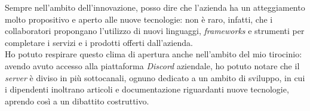 Sempre nell'ambito dell'innovazione, posso dire che l'azienda ha un atteggiamento molto propositivo e aperto alle nuove tecnologie: non è raro, infatti, che i collaboratori propongano l'utilizzo di nuovi linguaggi, \textit{frameworks} e strumenti per completare i servizi e i prodotti offerti dall'azienda. \\
Ho potuto respirare questo clima di apertura anche nell'ambito del mio tirocinio: avendo avuto accesso alla piattaforma \textit{Discord} aziendale, ho potuto notare che il \textit{server} è diviso in più sottocanali, ognuno dedicato a un ambito di sviluppo, in cui i dipendenti inoltrano articoli e documentazione riguardanti nuove tecnologie, aprendo così a un dibattito costruttivo.
